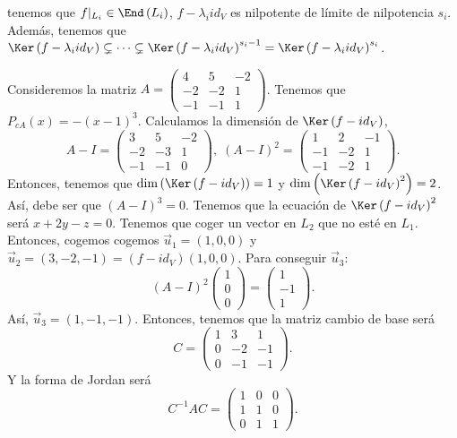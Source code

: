 tenemos que $\displaystyle f|_{L_{i}} \in \End\left(L_{i}\right) $, $\displaystyle f -\lambda_{i}id _{V} $ es nilpotente de límite de nilpotencia $\displaystyle s_{i} $. Además, tenemos que $\displaystyle \Ker\left(f - \lambda_{i} id _{V}\right) \subsetneq \cdots \subsetneq \Ker\left(f - \lambda_{i} id _{V}\right)^{s _{i}-1} = \Ker\left(f - \lambda_{i}id _{V}\right)^{s_{i}} $.
\begin{eg}
	\normalfont Consideremos la matriz $\displaystyle A = \begin{pmatrix} 4 & 5 & - 2 \\ - 2 & - 2 & 1 \\ - 1 & - 1 & 1 \end{pmatrix} $. Tenemos que $\displaystyle P_{cA}\left(x\right) = - \left(x-1\right)^{3} $. Calculamos la dimensión de $\displaystyle \Ker\left(f - id _{V}\right) $,
	\[A - I = \begin{pmatrix} 3 & 5 & -2 \\ -2 & - 3 & 1 \\ - 1 & - 1 & 0 \end{pmatrix}, \; \left(A - I\right)^{2} = \begin{pmatrix} 1 & 2 & -1 \\ -1 & -2 & 1 \\ - 1 & - 2 & 1 \end{pmatrix} .\]
Entonces, tenemos que $\displaystyle \dim\left(\Ker\left(f - id _{V}\right)\right) = 1 $ y $\displaystyle \dim\left(\Ker\left(f - id _{V}\right)^{2}\right) = 2 $. Así, debe ser que $\displaystyle \left(A - I\right)^{3} = 0 $. Tenemos que la ecuación de $\displaystyle \Ker\left(f - id _{V}\right)^{2} $ será $\displaystyle x +2y - z = 0 $. Tenemos que coger un vector en $\displaystyle L_{2} $ que no esté en $\displaystyle L_{1} $. Entonces, cogemos cogemos $\displaystyle \vec{u}_{1} = \left(1,0,0\right) $ y $\displaystyle \vec{u}_{2} = \left(3, -2, -1\right) = \left(f - id _{V}\right)\left(1,0,0\right) $. 
Para conseguir $\displaystyle \vec{u}_{3} $:
	\[ \left(A - I\right)^{2} \begin{pmatrix} 1 \\ 0 \\ 0 \end{pmatrix} = \begin{pmatrix} 1 \\ - 1 \\ 1 \end{pmatrix} .\]
Así, $\displaystyle \vec{u}_{3} = \left(1, - 1, - 1\right) $. Entonces, tenemos que la matriz cambio de base será
	\[ C = \begin{pmatrix} 1 & 3 & 1 \\ 0 & - 2& - 1 \\ 0 & - 1 & -1 \end{pmatrix} .\]
Y la forma de Jordan será
	\[ C^{-1}AC = \begin{pmatrix} 1 & 0 & 0 \\ 1 & 1 & 0 \\ 0 & 1 & 1 \end{pmatrix} .\]
\end{eg}
